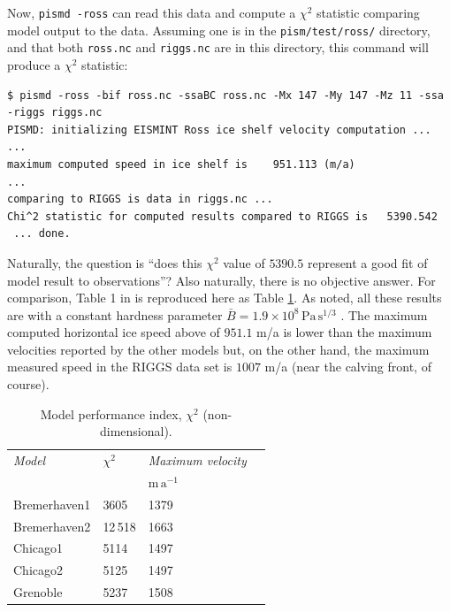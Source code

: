 \documentclass[11pt,final]{amsart}
\begin{document}
Now, \verb|pismd -ross| can read this data and compute a $\chi^2$ statistic comparing model output to the data.  Assuming one is in the \verb|pism/test/ross/| directory, and that both \verb|ross.nc| and \verb|riggs.nc| are in this directory, this command will produce a $\chi^2$ statistic:

\small\begin{verbatim}
$ pismd -ross -bif ross.nc -ssaBC ross.nc -Mx 147 -My 147 -Mz 11 -ssa -riggs riggs.nc
PISMD: initializing EISMINT Ross ice shelf velocity computation ...
...
maximum computed speed in ice shelf is    951.113 (m/a)
...
comparing to RIGGS is data in riggs.nc ...
Chi^2 statistic for computed results compared to RIGGS is   5390.542
 ... done.
\end{verbatim}
\normalsize

Naturally, the question is ``does this $\chi^2$ value of $5390.5$ represent a good fit of model result to observations''?  Also naturally, there is no objective answer.  For comparison, Table 1 in \cite{MacAyealetal} is reproduced here as Table \ref{tab:chisqr}.  As noted, all these results are with a constant hardness parameter $\bar B = 1.9 \times 10^8 \, \text{Pa}\, \text{s}^{1/3}$ \cite{MacAyealetal}.  The maximum computed horizontal ice speed above of $951.1$ m/a is lower than the maximum velocities reported by the other models but, on the other hand, the maximum measured speed in the RIGGS data set is $1007$ m/a (near the calving front, of course).

\small
\begin{table}[ht]
\caption{Model performance index, $\chi^2$ (non-dimensional).  }\label{tab:chisqr}
\begin{tabular}{@{}llll}\hline
\textsl{Model} & $\chi^2$ & \textsl{Maximum velocity} \\
 & & $\text{m}\,\text{a}^{-1}$ \\ \hline
Bremerhaven1 & 3605 & 1379 \\
Bremerhaven2 & 12\,518 & 1663 \\
Chicago1 & 5114 & 1497 \\
Chicago2 & 5125 & 1497 \\
Grenoble & 5237 & 1508 \\
\hline
\end{tabular}
\end{table}
\normalsize
\end{document}

